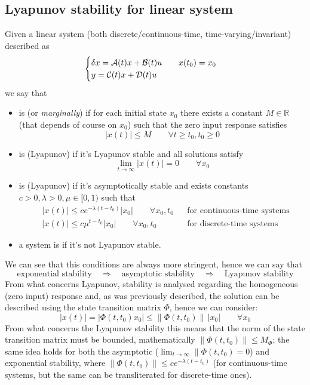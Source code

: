 	\subsection*{Lyapunov stability for linear system}
	Given a linear system (both discrete/continuous-time, time-varying/invariant) described as
	\[ \begin{cases}
		\delta x = \mathcal{A}(t) x + \mathcal{B}(t) u \qquad x(t_0) = x_0 \\ y= \mathcal{C}(t) x + \mathcal{D}(t) u
	\end{cases} \]
	we say that
	\begin{itemize}
		\item is  (or \textit{marginally})  if for each initial state $x_0$ there exists a constant $M\in \mathds R$ (that depends of course on $x_0$) such that the zero input response satisfies
		\[ |x(t)| \leq M \qquad \forall t\geq t_0,t_0 \geq 0 \]
		\item is (Lyapunov)  if it's Lyapunov stable and all solutions satisfy
		\[ \lim_{t\rightarrow \infty} |x(t)|=0 \qquad \forall x_0 \]
		\item is (Lyapunov)  if it's asymptotically stable and exists constants $c>0, \lambda > 0, \mu \in [0,1)$ such that
		\begin{align*}
			& |x(t)| \leq ce^{-\lambda(t-t_0)} |x_0| \qquad \forall x_0,t_0 &&  \textrm{for continuous-time systems} \\
			& |x(t)| \leq c\mu^{t-t_0} |x_0| \qquad \forall x_0,t_0 &&  \textrm{for discrete-time systems} 
		\end{align*}
		\item a system is  if it's not Lyapunov stable.
	\end{itemize}
	We can see that this conditions are always more stringent, hence we can say that
	\[ \textrm{exponential stability} \quad \Rightarrow \quad \textrm{asymptotic stability} \quad \Rightarrow \quad \textrm{Lyapunov stability} \]
	From what concerns Lyapunov, stability is analysed regarding the homogeneous (zero input) response and, as was previously described, the solution can be described using the state transition matrix $\Phi$, hence we can consider:
	\[ |x(t)| = |\Phi(t,t_0)x_0| \leq \|\Phi(t,t_0)\|\, |x_0| \qquad \forall x_0 \]
	From what concerns the Lyapunov stability this means that the norm of the state transition matrix must be bounded, mathematically $\|\Phi(t,t_0)\| \leq M_\Phi$; the same idea holds for both the asymptotic ($\lim_{t\rightarrow \infty} \|\Phi(t,t_0) = 0$) and exponential stability, where $\|\Phi(t,t_0)\| \leq c e^{-\lambda(t-t_0)}$ (for continuous-time systems, but the same can be transliterated for discrete-time ones).
	
